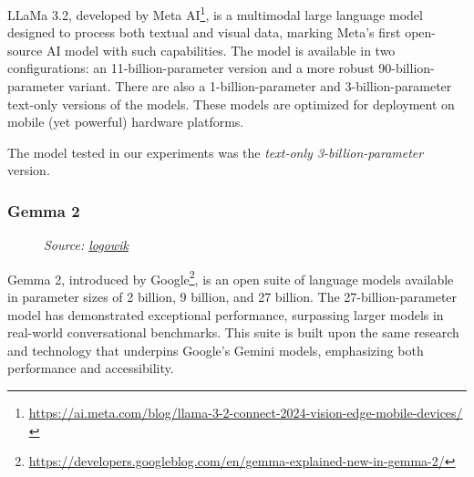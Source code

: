 LLaMa 3.2, developed by Meta AI\footnote{\url{https://ai.meta.com/blog/llama-3-2-connect-2024-vision-edge-mobile-devices/}},
is a multimodal large language model designed to process both textual and visual
data, marking Meta's first open-source AI model with such capabilities. The
model is available in two configurations: an 11-billion-parameter version and a more
robust 90-billion-parameter variant. There are also a 1-billion-parameter and 3-billion-parameter
text-only versions of the models. These models are optimized for deployment on mobile
(yet powerful) hardware platforms.

The model tested in our experiments was the \emph{text-only 3-billion-parameter}
version.
\vspace{8mm}
\subsubsection{Gemma 2}
\begin{figure}
  \centering
  \def\stackalignment{l}
  {\scriptsize \parbox[t]{\linewidth}{\emph{Source: \href{https://logowik.com/google-gemma-ai-logo-vector-71178.html}{logowik}}}}
\end{figure}
Gemma 2, introduced by Google\footnote{\url{https://developers.googleblog.com/en/gemma-explained-new-in-gemma-2/}},
is an open suite of language models available in parameter sizes of 2 billion, 9
billion, and 27 billion. The 27-billion-parameter model has demonstrated exceptional
performance, surpassing larger models in real-world conversational benchmarks. This
suite is built upon the same research and technology that underpins Google's Gemini
models, emphasizing both performance and accessibility.

